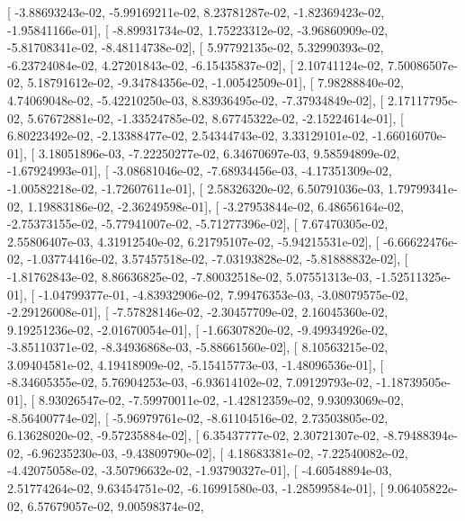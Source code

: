 \documentclass{article}
\begin{document}
       [ -3.88693243e-02,  -5.99169211e-02,   8.23781287e-02,
         -1.82369423e-02,  -1.95841166e-01],
       [ -8.89931734e-02,   1.75223312e-02,  -3.96860909e-02,
         -5.81708341e-02,  -8.48114738e-02],
       [  5.97792135e-02,   5.32990393e-02,  -6.23724084e-02,
          4.27201843e-02,  -6.15435837e-02],
       [  2.10741124e-02,   7.50086507e-02,   5.18791612e-02,
         -9.34784356e-02,  -1.00542509e-01],
       [  7.98288840e-02,   4.74069048e-02,  -5.42210250e-03,
          8.83936495e-02,  -7.37934849e-02],
       [  2.17117795e-02,   5.67672881e-02,  -1.33524785e-02,
          8.67745322e-02,  -2.15224614e-01],
       [  6.80223492e-02,  -2.13388477e-02,   2.54344743e-02,
          3.33129101e-02,  -1.66016070e-01],
       [  3.18051896e-03,  -7.22250277e-02,   6.34670697e-03,
          9.58594899e-02,  -1.67924993e-01],
       [ -3.08681046e-02,  -7.68934456e-03,  -4.17351309e-02,
         -1.00582218e-02,  -1.72607611e-01],
       [  2.58326320e-02,   6.50791036e-03,   1.79799341e-02,
          1.19883186e-02,  -2.36249598e-01],
       [ -3.27953844e-02,   6.48656164e-02,  -2.75373155e-02,
         -5.77941007e-02,  -5.71277396e-02],
       [  7.67470305e-02,   2.55806407e-03,   4.31912540e-02,
          6.21795107e-02,  -5.94215531e-02],
       [ -6.66622476e-02,  -1.03774416e-02,   3.57457518e-02,
         -7.03193828e-02,  -5.81888832e-02],
       [ -1.81762843e-02,   8.86636825e-02,  -7.80032518e-02,
          5.07551313e-03,  -1.52511325e-01],
       [ -1.04799377e-01,  -4.83932906e-02,   7.99476353e-03,
         -3.08079575e-02,  -2.29126008e-01],
       [ -7.57828146e-02,  -2.30457709e-02,   2.16045360e-02,
          9.19251236e-02,  -2.01670054e-01],
       [ -1.66307820e-02,  -9.49934926e-02,  -3.85110371e-02,
         -8.34936868e-03,  -5.88661560e-02],
       [  8.10563215e-02,   3.09404581e-02,   4.19418909e-02,
         -5.15415773e-03,  -1.48096536e-01],
       [ -8.34605355e-02,   5.76904253e-03,  -6.93614102e-02,
          7.09129793e-02,  -1.18739505e-01],
       [  8.93026547e-02,  -7.59970011e-02,  -1.42812359e-02,
          9.93093069e-02,  -8.56400774e-02],
       [ -5.96979761e-02,  -8.61104516e-02,   2.73503805e-02,
          6.13628020e-02,  -9.57235884e-02],
       [  6.35437777e-02,   2.30721307e-02,  -8.79488394e-02,
         -6.96235230e-03,  -9.43809790e-02],
       [  4.18683381e-02,  -7.22540082e-02,  -4.42075058e-02,
         -3.50796632e-02,  -1.93790327e-01],
       [ -4.60548894e-03,   2.51774264e-02,   9.63454751e-02,
         -6.16991580e-03,  -1.28599584e-01],
       [  9.06405822e-02,   6.57679057e-02,   9.00598374e-02,
\end{document}
